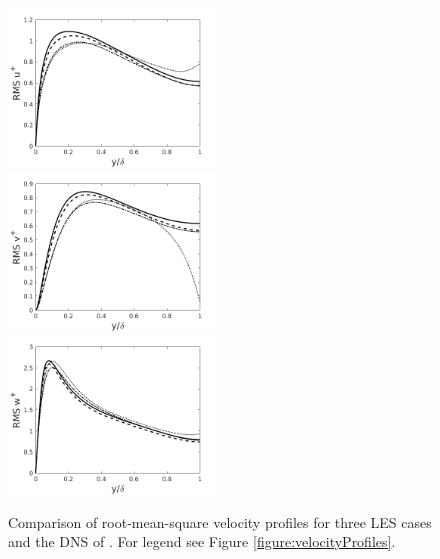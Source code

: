\documentclass[12pt,oneside,a4paper]{article}
\begin{document}
\begin{figure}[!b]
\centering
\includegraphics[width=0.5\textwidth]{images/rms_u.png}\hfill
\includegraphics[width=0.5\textwidth]{images/rms_v.png}\\
\includegraphics[width=0.5\textwidth]{images/rms_w.png}
\caption{Comparison of root-mean-square velocity profiles for three LES cases and the DNS of \cite{vreman2014}. For legend see Figure \ref{figure:velocityProfiles}.}
\label{figure:rmsVelocityProfiles}
\end{figure}
\end{document}
